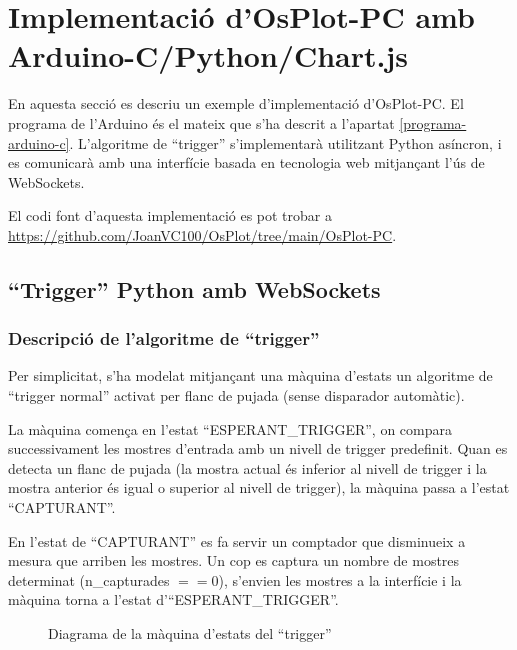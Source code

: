 \documentclass{tfgitic}[2023/06/30]
\begin{document}
\chapter{Implementació d'OsPlot-PC amb Arduino-C/Python/Chart.js}

En aquesta secció es descriu un exemple d'implementació
d'OsPlot-PC. El programa de l'Arduino és el mateix que s'ha descrit a
l'apartat \ref{programa-arduino-c}. L'algoritme de ``trigger''
s'implementarà utilitzant Python asíncron, i es comunicarà amb una
interfície basada en tecnologia web mitjançant l'ús de WebSockets.

El codi font d'aquesta implementació es pot trobar a
\url{https://github.com/JoanVC100/OsPlot/tree/main/OsPlot-PC}.

\section{``Trigger'' Python amb WebSockets}

\subsection{Descripció de l'algoritme de ``trigger''}
\label{subsec:maquina-trigger}

Per simplicitat, s'ha modelat mitjançant una màquina d'estats un
algoritme de ``trigger normal'' activat per flanc de pujada (sense
disparador automàtic).

La màquina comença en l'estat ``ESPERANT\_TRIGGER'', on compara
successivament les mostres d'entrada amb un nivell de trigger
predefinit. Quan es detecta un flanc de pujada (la mostra actual és
inferior al nivell de trigger i la mostra anterior és igual o superior
al nivell de trigger), la màquina passa a l'estat ``CAPTURANT''.

En l'estat de ``CAPTURANT'' es fa servir un comptador que disminueix a
mesura que arriben les mostres. Un cop es captura un nombre de mostres
determinat (n\_capturades $== 0$), s'envien les mostres a la
interfície i la màquina torna a l'estat d'``ESPERANT\_TRIGGER''.

\begin{figure}[!hb]
      \centering
      \caption{Diagrama de la màquina d'estats del ``trigger''}
\end{figure}
\end{document}

